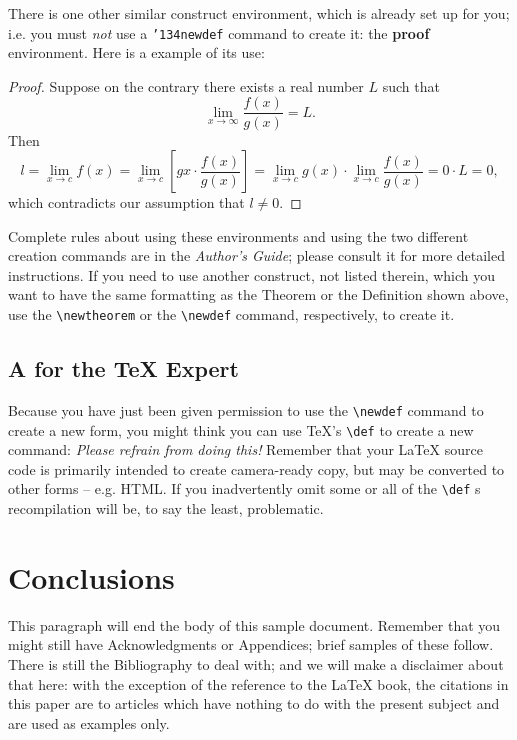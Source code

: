 \documentclass{acm_proc_article-sp}
\begin{document}
There is one other similar construct environment, which is
already set up
for you; i.e. you must \textit{not} use
a \texttt{{\char'134}newdef} command to
create it: the \textbf{proof} environment.  Here
is a example of its use:
\begin{proof}
Suppose on the contrary there exists a real number $L$ such that
\begin{displaymath}
\lim_{x\rightarrow\infty} \frac{f(x)}{g(x)} = L.
\end{displaymath}
Then
\begin{displaymath}
l=\lim_{x\rightarrow c} f(x)
= \lim_{x\rightarrow c}
\left[ g{x} \cdot \frac{f(x)}{g(x)} \right ]
= \lim_{x\rightarrow c} g(x) \cdot \lim_{x\rightarrow c}
\frac{f(x)}{g(x)} = 0\cdot L = 0,
\end{displaymath}
which contradicts our assumption that $l\neq 0$.
\end{proof}

Complete rules about using these environments and using the two
different creation commands are in the \textit{Author's Guide}; please
consult it for more detailed instructions.  If you need to use another
construct, not listed therein, which you want to have the same
formatting as the Theorem or the Definition\cite{salas:calculus} shown
above, use the \texttt{\textbackslash{}newtheorem} or the \texttt{\textbackslash{}newdef} command, respectively,
to create it.
\subsection{A {} for the \TeX{} Expert}
\label{sec-3-7}

Because you have just been given permission to use the \texttt{\textbackslash{}newdef}
command to create a new form, you might think you can use \TeX's
\texttt{\textbackslash{}def} to create a new command: \emph{Please refrain from doing this!}
Remember that your \LaTeX{} source code is primarily intended to create
camera-ready copy, but may be converted to other forms --
e.g. HTML. If you inadvertently omit some or all of the \texttt{\textbackslash{}def} s
recompilation will be, to say the least, problematic.
\section{Conclusions}
\label{sec-4}

This paragraph will end the body of this sample document.
Remember that you might still have Acknowledgments or
Appendices; brief samples of these
follow.  There is still the Bibliography to deal with; and
we will make a disclaimer about that here: with the exception
of the reference to the \LaTeX{} book, the citations in
this paper are to articles which have nothing to
do with the present subject and are used as
examples only.
\end{document}
